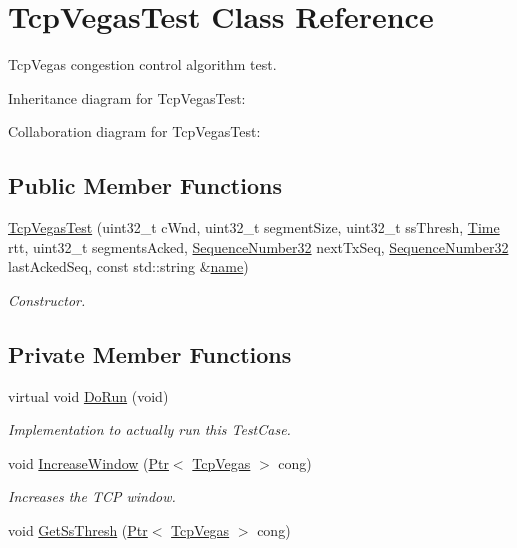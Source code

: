 \hypertarget{classTcpVegasTest}{}\section{Tcp\+Vegas\+Test Class Reference}
\label{classTcpVegasTest}


Tcp\+Vegas congestion control algorithm test.  




Inheritance diagram for Tcp\+Vegas\+Test\+:


Collaboration diagram for Tcp\+Vegas\+Test\+:
\subsection*{Public Member Functions}
\begin{DoxyCompactItemize}
\item 
\hyperlink{classTcpVegasTest_adf1b05938e988d59682888d2ce9e940f}{Tcp\+Vegas\+Test} (uint32\+\_\+t c\+Wnd, uint32\+\_\+t segment\+Size, uint32\+\_\+t ss\+Thresh, \hyperlink{classns3_1_1Time}{Time} rtt, uint32\+\_\+t segments\+Acked, \hyperlink{group__network_gacb2070e4e98d2d5135c9bede58f07a03}{Sequence\+Number32} next\+Tx\+Seq, \hyperlink{group__network_gacb2070e4e98d2d5135c9bede58f07a03}{Sequence\+Number32} last\+Acked\+Seq, const std\+::string \&\hyperlink{generate__test__data__lte__spectrum__model_8m_ab74e6bf80237ddc4109968cedc58c151}{name})
\begin{DoxyCompactList}\small\item\em Constructor. \end{DoxyCompactList}\end{DoxyCompactItemize}
\subsection*{Private Member Functions}
\begin{DoxyCompactItemize}
\item 
virtual void \hyperlink{classTcpVegasTest_a00eaa735d1666ec15d51ad98cf584087}{Do\+Run} (void)
\begin{DoxyCompactList}\small\item\em Implementation to actually run this Test\+Case. \end{DoxyCompactList}\item 
void \hyperlink{classTcpVegasTest_a87d311143a7c0f4d91624641965b1ced}{Increase\+Window} (\hyperlink{classns3_1_1Ptr}{Ptr}$<$ \hyperlink{classns3_1_1TcpVegas}{Tcp\+Vegas} $>$ cong)
\begin{DoxyCompactList}\small\item\em Increases the T\+CP window. \end{DoxyCompactList}\item 
void \hyperlink{classTcpVegasTest_a569cf1bac86619b1d7f458b790a48d93}{Get\+Ss\+Thresh} (\hyperlink{classns3_1_1Ptr}{Ptr}$<$ \hyperlink{classns3_1_1TcpVegas}{Tcp\+Vegas} $>$ cong)
\end{DoxyCompactItemize}
